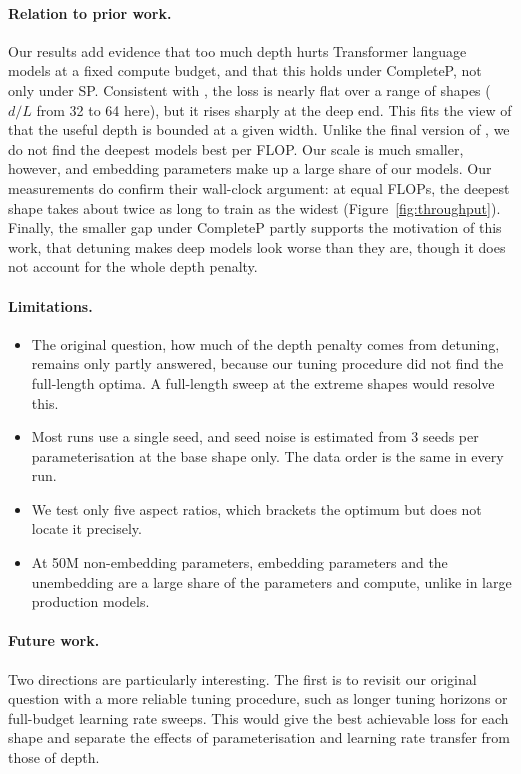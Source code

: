 \documentclass[10pt,twocolumn,a4paper]{article}
\begin{document}
\paragraph{Relation to prior work.} Our results add evidence that too much depth hurts Transformer language models at a fixed compute budget, and that this holds under CompleteP, not only under SP. Consistent with \citet{kaplan2020scaling}, the loss is nearly flat over a range of shapes ($d/L$ from 32 to 64 here), but it rises sharply at the deep end. This fits the view of \citet{levine2020limits} that the useful depth is bounded at a given width. Unlike the final version of \citet{mcleish2025gemstones}, we do not find the deepest models best per FLOP. Our scale is much smaller, however, and embedding parameters make up a large share of our models. Our measurements do confirm their wall-clock argument: at equal FLOPs, the deepest shape takes about twice as long to train as the widest (Figure~\ref{fig:throughput}). Finally, the smaller gap under CompleteP partly supports the motivation of this work, that detuning makes deep models look worse than they are, though it does not account for the whole depth penalty.

\paragraph{Limitations.}
\begin{itemize}[leftmargin=*,itemsep=1pt]
    \item The original question, how much of the depth penalty comes from detuning, remains only partly answered, because our tuning procedure did not find the full-length optima. A full-length sweep at the extreme shapes would resolve this.
    \item Most runs use a single seed, and seed noise is estimated from 3 seeds per parameterisation at the base shape only. The data order is the same in every run.
    \item We test only five aspect ratios, which brackets the optimum but does not locate it precisely.
    \item At 50M non-embedding parameters, embedding parameters and the unembedding are a large share of the parameters and compute, unlike in large production models.
\end{itemize}

\paragraph{Future work.} Two directions are particularly interesting. The first is to revisit our original question with a more reliable tuning procedure, such as longer tuning horizons or full-budget learning rate sweeps. This would give the best achievable loss for each shape and separate the effects of parameterisation and learning rate transfer from those of depth.
\end{document}
